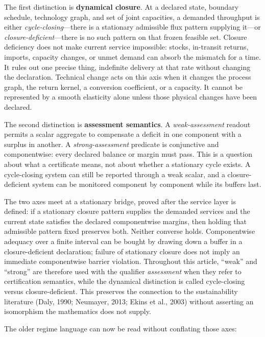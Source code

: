 \documentclass[11pt]{article}
\begin{document}
The first distinction is \textbf{dynamical closure}. At a declared state, boundary schedule, technology graph, and set of joint capacities, a demanded throughput is either \emph{cycle-closing}---there is a stationary admissible flux pattern supplying it---or \emph{closure-deficient}---there is no such pattern on that frozen feasible set. Closure deficiency does not make current service impossible: stocks, in-transit returns, imports, capacity changes, or unmet demand can absorb the mismatch for a time. It rules out one precise thing, indefinite delivery at that rate without changing the declaration. Technical change acts on this axis when it changes the process graph, the return kernel, a conversion coefficient, or a capacity. It cannot be represented by a smooth elasticity alone unless those physical changes have been declared.

The second distinction is \textbf{assessment semantics}. A \emph{weak-assessment} readout permits a scalar aggregate to compensate a deficit in one component with a surplus in another. A \emph{strong-assessment} predicate is conjunctive and componentwise: every declared balance or margin must pass. This is a question about what a certificate means, not about whether a stationary cycle exists. A cycle-closing system can still be reported through a weak scalar, and a closure-deficient system can be monitored component by component while its buffers last.

The two axes meet at a stationary bridge, proved after the service layer is defined: if a stationary closure pattern supplies the demanded services and the current state satisfies the declared componentwise margins, then holding that admissible pattern fixed preserves both. Neither converse holds. Componentwise adequacy over a finite interval can be bought by drawing down a buffer in a closure-deficient declaration; failure of stationary closure does not imply an immediate componentwise barrier violation. Throughout this article, ``weak'' and ``strong'' are therefore used with the qualifier \emph{assessment} when they refer to certification semantics, while the dynamical distinction is called cycle-closing versus closure-deficient. This preserves the connection to the sustainability literature (Daly, 1990; Neumayer, 2013; Ekins et al., 2003) without asserting an isomorphism the mathematics does not supply.

The older regime language can now be read without conflating those axes:
\end{document}
